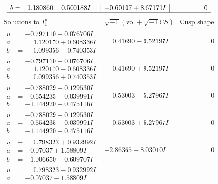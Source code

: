 \documentclass[1p]{elsarticle_modified}
\theoremstyle{definition}
\newcommand{\I}{\sqrt{-1}}
\begin{document}
$$\begin{array}{c|c|c}
\begin{aligned}
b &= -1.180860 + 0.500188 I\end{aligned}
 & -0.60107 + 8.67171 I & \phantom{-0.000000 } 0\\
 \hline 
 \end{array}$$\newpage$$\begin{array}{c|c|c}  
\text{Solutions to }I^u_{1}& \I (\text{vol} + \sqrt{-1}CS) & \text{Cusp shape}\\
 \hline 
\begin{aligned}
u &= -0.797110 + 0.076706 I \\
a &= \phantom{-}1.120170 + 0.608336 I \\
b &= \phantom{-}0.099356 - 0.740353 I\end{aligned}
 & \phantom{-}0.41690 - 9.52197 I & \phantom{-0.000000 } 0 \\ \hline\begin{aligned}
u &= -0.797110 - 0.076706 I \\
a &= \phantom{-}1.120170 - 0.608336 I \\
b &= \phantom{-}0.099356 + 0.740353 I\end{aligned}
 & \phantom{-}0.41690 + 9.52197 I & \phantom{-0.000000 } 0 \\ \hline\begin{aligned}
u &= -0.788029 + 0.129530 I \\
a &= -0.654235 - 0.039991 I \\
b &= -1.144920 - 0.475116 I\end{aligned}
 & \phantom{-}0.53003 - 5.27967 I & \phantom{-0.000000 } 0 \\ \hline\begin{aligned}
u &= -0.788029 - 0.129530 I \\
a &= -0.654235 + 0.039991 I \\
b &= -1.144920 + 0.475116 I\end{aligned}
 & \phantom{-}0.53003 + 5.27967 I & \phantom{-0.000000 } 0 \\ \hline\begin{aligned}
u &= \phantom{-}0.798323 + 0.932992 I \\
a &= -0.07037 + 1.58809 I \\
b &= -1.006650 - 0.609707 I\end{aligned}
 & -2.86365 - 8.03010 I & \phantom{-0.000000 } 0 \\ \hline\begin{aligned}
u &= \phantom{-}0.798323 - 0.932992 I \\
a &= -0.07037 - 1.58809 I \\

\end{aligned}
\end{array}$$
\end{document}
